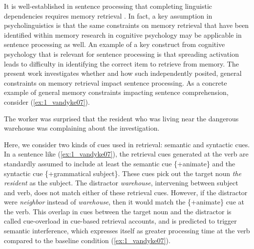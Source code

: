 \documentclass[review,preprint,12pt,authoryear,floatsintext]{elsarticle}
\begin{document}
{
It is well-established in sentence processing that completing linguistic dependencies requires memory retrieval \citep[see e.g., ][]{lewis06}. In fact, a key assumption in psycholinguistics is that the same constraints on memory retrieval that have been identified within memory research in cognitive psychology \citep[e.g., ][]{anderson_etal_2004_ACT_R} may be applicable in sentence processing as well. An example of a key construct from cognitive psychology that is relevant for sentence processing is that spreading activation leads to difficulty in identifying the correct item to retrieve from memory. The present work investigates whether and how such independently posited, general constraints on memory retrieval impact sentence processing. As a concrete example of general memory constraints impacting sentence comprehension, consider (\ref{ex:1_vandyke07}).

\begin{exe}[ht]
\ex \label{ex:1_vandyke07} 
The worker was surprised that the resident who was living near the dangerous warehouse was complaining about the investigation. \citep{vandyke07}
\end{exe}
}

Here, we consider two kinds of cues used in retrieval: semantic and  syntactic cues.
In a sentence like (\ref{ex:1_vandyke07}), the retrieval cues generated at the verb are standardly assumed \citep[e.g.,][]{vandyke07} to include at least the semantic cue \{+animate\} and the syntactic cue \{+grammatical subject\}. These cues pick out the target noun \textit{the resident} as the subject. The distractor \textit{warehouse}, intervening between subject and verb, does not match either of these retrieval cues. However, if the distractor were \textit{neighbor} instead of \textit{warehouse}, then it would match the \{+animate\} cue at the verb. This overlap in cues between the target noun and the distractor is called cue-overload in cue-based retrieval accounts, and is predicted to trigger semantic interference, which expresses itself as greater processing time at the verb compared to the baseline condition (\ref{ex:1_vandyke07}).
\end{document}
